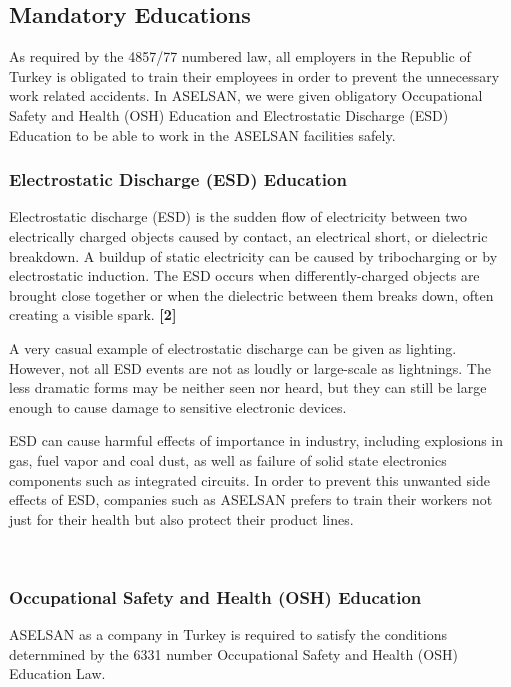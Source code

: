 \subsection{Mandatory Educations}
\- \indent
	As required by the 4857/77  numbered law, all employers in the Republic of Turkey is obligated to train their employees in order to prevent the unnecessary work related accidents. In ASELSAN, we were given obligatory Occupational Safety and Health (OSH) Education and Electrostatic Discharge (ESD) Education to be able to work in the ASELSAN facilities safely.
	
	
	
\subsubsection{Electrostatic Discharge (ESD) Education }
\- \indent
	Electrostatic discharge (ESD) is the sudden flow of electricity between two electrically charged objects caused by contact, an electrical short, or dielectric breakdown. A buildup of static electricity can be caused by tribocharging or by electrostatic induction. The ESD occurs when differently-charged objects are brought close together or when the dielectric between them breaks down, often creating a visible spark. \textbf{[2]}

	A very casual example of electrostatic discharge can be given as lighting. However, not all ESD events are not as loudly or large-scale as lightnings. The less dramatic forms  may be neither seen nor heard, but they can still be large enough to cause damage to sensitive electronic devices. 

	ESD can cause harmful effects of importance in industry, including explosions in gas, fuel vapor and coal dust, as well as failure of solid state electronics components such as integrated circuits. In order to prevent this unwanted side effects of ESD, companies such as ASELSAN prefers to train their workers not just for their health but also protect their product lines. 

\-\\

\subsubsection{Occupational Safety and Health (OSH) Education}
\- \indent
	ASELSAN as a company in Turkey is required to satisfy the conditions deternmined by the 6331 number Occupational Safety and Health (OSH) Education Law. 
	
